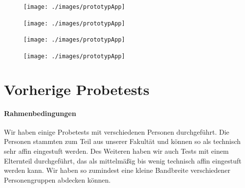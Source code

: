 \begin{figure}
  \vspace{-20pt}
  \begin{center}
    \texttt{[image: ./images/prototypApp]}
  \end{center}
  \vspace{-40pt}
\end{figure}


\begin{figure}
  \vspace{-20pt}
  \begin{center}
    \texttt{[image: ./images/prototypApp]}
  \end{center}
  \vspace{-40pt}
\end{figure}


\begin{figure}
  \vspace{-20pt}
  \begin{center}
    \texttt{[image: ./images/prototypApp]}
  \end{center}
  \vspace{-40pt}
\end{figure}


\begin{figure}
  \vspace{-20pt}
  \begin{center}
    \texttt{[image: ./images/prototypApp]}
  \end{center}
  \vspace{-40pt}
\end{figure}


\clearpage
\section{Vorherige Probetests}
\label{sec:probetests}

\paragraph{Rahmenbedingungen}
Wir haben einige Probetests mit verschiedenen Personen durchgeführt. Die Personen stammten zum Teil aus unserer Fakultät und können so als technisch sehr affin eingestuft werden. Des Weiteren haben wir auch Tests mit einem Elternteil durchgeführt, das als mittelmäßig bis wenig technisch affin eingestuft werden kann. Wir haben so zumindest eine kleine Bandbreite verschiedener Personengruppen abdecken können.

